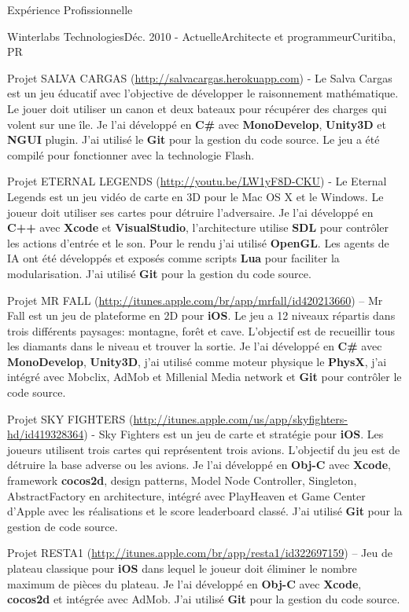 \documentclass{resume}
\begin{document}
\begin{rSection}{Expérience Profissionnelle}
\begin{rSubsection}{Winterlabs Technologies}{Déc. 2010 - 
Actuelle}{Architecte et programmeur}{Curitiba, PR}
    \item Projet SALVA CARGAS (\url{http://salvacargas.herokuapp.com}) - Le Salva Cargas est un jeu éducatif avec l'objective de développer le raisonnement mathématique. Le jouer doit utiliser un canon et deux bateaux pour récupérer des charges qui volent sur une île. Je l'ai développé en \textbf{C\#} avec \textbf{MonoDevelop}, \textbf{Unity3D} et \textbf{NGUI} plugin. J'ai utilisé le \textbf{Git} pour la gestion du code source. Le jeu a été compilé pour fonctionner avec la technologie Flash. \\
    \item Projet ETERNAL LEGENDS (\url{http://youtu.be/LW1yF8D-CKU}) - Le Eternal Legends est un jeu vidéo de carte en 3D pour le Mac OS X et le Windows. Le joueur doit utiliser ses cartes pour détruire l'adversaire. Je l’ai développé en \textbf{C++} avec \textbf{Xcode} et \textbf{VisualStudio}, l’architecture utilise \textbf{SDL} pour contrôler les actions d’entrée et le son. Pour le rendu j’ai utilisé \textbf{OpenGL}. Les agents de IA ont été développés et exposés comme scripts \textbf{Lua} pour faciliter la modularisation. J’ai utilisé \textbf{Git} pour la gestion du code source. \\
    \item Projet MR FALL (\url{http://itunes.apple.com/br/app/mrfall/id420213660}) – Mr Fall est un jeu de plateforme en 2D pour \textbf{iOS}. Le jeu a 12 niveaux répartis dans trois différents paysages: montagne, forêt et cave. L'objectif est de recueillir tous les diamants dans le niveau et trouver la sortie. Je l’ai développé en \textbf{C\#} avec \textbf{MonoDevelop}, \textbf{Unity3D}, j'ai utilisé comme moteur physique le \textbf{PhysX}, j'ai intégré avec Mobclix, AdMob et Millenial Media network et \textbf{Git} pour  contrôler le code source. \\
    \item Projet SKY FIGHTERS (\url{http://itunes.apple.com/us/app/skyfighters-hd/id419328364}) - Sky Fighters est un jeu de carte et stratégie pour \textbf{iOS}. Les joueurs utilisent trois cartes qui représentent trois avions. L'objectif du jeu est de détruire la base adverse ou les avions. Je l’ai développé en \textbf{Obj-C} avec \textbf{Xcode}, framework \textbf{cocos2d}, design patterns, Model Node Controller, Singleton, AbstractFactory en architecture, intégré avec PlayHeaven et Game Center d'Apple avec les réalisations et le score leaderboard classé. J’ai utilisé \textbf{Git} pour la gestion de code source. \\
    \item Projet RESTA1 (\url{http://itunes.apple.com/br/app/resta1/id322697159}) – Jeu de plateau classique pour \textbf{iOS} dans lequel le joueur doit éliminer le nombre maximum de pièces du plateau. Je l’ai développé en \textbf{Obj-C} avec \textbf{Xcode}, \textbf{cocos2d} et intégrée avec AdMob. J’ai utilisé \textbf{Git} pour la gestion du code source.

\end{rSubsection}
\end{rSection}
\end{document}

